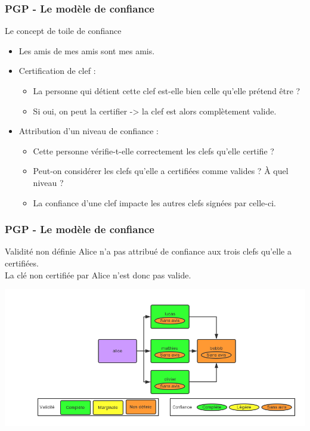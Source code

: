 \begin{frame}
  \frametitle{\color{white}PGP - Le modèle de confiance}
    \begin{block}{Le concept de toile de confiance}
      \begin{itemize}
    \item Les amis de mes amis sont mes amis.
    \item Certification de clef :
      \begin{itemize}
       \item La personne qui détient cette clef est-elle bien celle qu'elle prétend être ?
       \item Si oui, on peut la certifier -> la clef est alors complètement valide.
      \end{itemize}
    \item Attribution d'un niveau de confiance :
      \begin{itemize}
       \item Cette personne vérifie-t-elle correctement les clefs qu'elle certifie ?
       \item Peut-on considérer les clefs qu'elle a certifiées comme valides ? À quel niveau ?
       \item La confiance d'une clef impacte les autres clefs signées par celle-ci.
      \end{itemize}   
       \end{itemize} 
    \end{block}
\end{frame}
\begin{frame}
  \frametitle{\color{white}PGP - Le modèle de confiance}
    \begin{block}{Validité non définie}
      Alice n'a pas attribué de confiance aux trois clefs qu'elle a certifiées.\\
      La clé non certifiée par Alice n'est donc pas valide.
    \end{block}
    \includegraphics[scale=0.3]{tdcdemoUndefined.png}
\end{frame}
